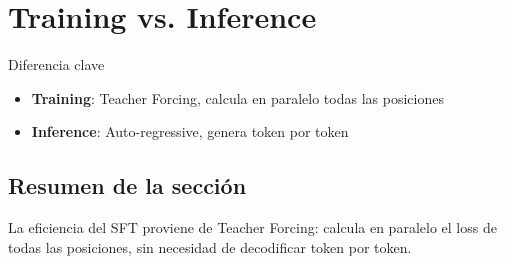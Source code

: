 \section{Training vs. Inference}
\begin{warningbox}{Diferencia clave}
\begin{itemize}
  \item \textbf{Training}: Teacher Forcing, calcula en paralelo todas las posiciones
  \item \textbf{Inference}: Auto-regressive, genera token por token
\end{itemize}
\end{warningbox}

\subsection{Resumen de la sección}
La eficiencia del SFT proviene de Teacher Forcing: calcula en paralelo el loss de todas las posiciones, sin necesidad de decodificar token por token.

\newpage
